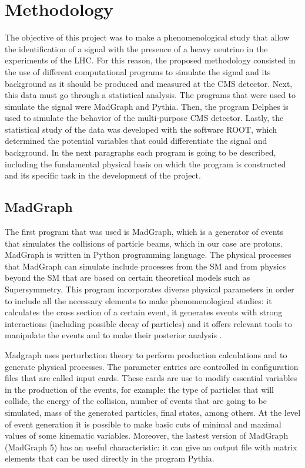 \chapter{Methodology} 
\label{Methodology_chapter}

The objective of this project was to make a phenomenological study that allow the identification of a signal with the presence of a heavy neutrino in the experiments of the LHC. For this reason, 
the proposed methodology consisted in the use of different computational programs to simulate the signal and its background as it should be produced and measured at the CMS detector. Next, this 
data must go through a statistical analysis. The programs that were used to simulate the signal were MadGraph and Pythia. Then, the program Delphes is 
used to simulate the behavior of the multi-purpose CMS detector. Lastly, the statistical study of the data was developed with the software ROOT, which determined the 
potential variables that could differentiate the signal and background. In the next paragraphs each program is going to be described, including the fundamental physical basis on which the program 
is constructed and its specific task in the development of the project.

\section{MadGraph}

The first program that was used is MadGraph, which is a generator of events that simulates the collisions of particle beams, which in our case are protons. MadGraph is written in Python programming 
language. The physical processes that MadGraph can simulate include processes from the SM and from physics beyond the SM that are based on certain theoretical models such as Supersymmetry. This 
program incorporates diverse physical parameters in order to include all the necessary elements to make phenomenological studies: it calculates the cross section of a certain event, it generates 
events with strong interactions (including possible decay of particles) and it offers relevant tools to manipulate the events and to make their posterior analysis  \cite{MadGraph 1}. 

Madgraph uses perturbation theory to perform production calculations and to generate physical processes. The parameter entries are controlled in configuration files that are called input cards. 
These cards are use to modify essential variables in the production of the events, for example: the type of particles that will collide, the energy of the collision, number of events that are going
to be simulated, mass of the generated particles, final states, among others. At the level of event generation it is possible to make basic cuts of minimal and maximal values of some kinematic
variables. Moreover, the lastest version of MadGraph (MadGraph 5) has an useful characteristic: it can give an output file with matrix elements that can be used directly in the program Pythia. 

